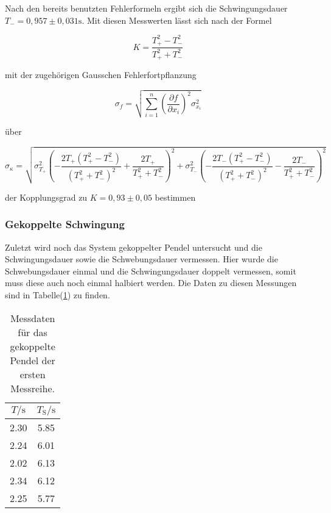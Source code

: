             \noindent Nach den bereits benutzten Fehlerformeln ergibt sich die Schwingungsdauer $T_- = 0,957 \pm 0,031 \si{\second}$.
            Mit diesen Messwerten lässt sich nach der Formel 

            \begin{equation*}
            K = \frac{T_{+}^2 - T_{-}^2}{T_{+}^2 + T_{-}^2} 
            \end{equation*}

            \noindent mit der zugehörigen Gausschen Fehlerfortpflanzung
            
            \begin{equation}
            \sigma_f = \sqrt{\sum_{i=1}^{n} \left( \frac{\partial f}{\partial x_i} \right)^2 \sigma_{x_i}^2}
            \label{eqn:gauss}
            \end{equation}
            
            \noindent über

            \begin{equation*}
                \sigma_{\kappa} = \sqrt{\sigma_{T_{+}}^{2} \left(- \frac{2 T_{+} \left(T_{+}^{2} - T_{-}^{2}\right)}{\left(T_{+}^{2}
                 + T_{-}^{2}\right)^{2}} + \frac{2 T_{+}}{T_{+}^{2} + T_{-}^{2}}\right)^{2} + \sigma_{T_{-}}^{2} \left(- \frac{2 T_{-}
                  \left(T_{+}^{2} - T_{-}^{2}\right)}{\left(T_{+}^{2} + T_{-}^{2}\right)^{2}} - \frac{2 T_{-}}{T_{+}^{2} + T_{-}^{2}}\right)^{2}}
            \end{equation*}

            \noindent der Kopplungsgrad zu $K = 0,93 \pm 0,05$ bestimmen

        \subsubsection{Gekoppelte Schwingung}

            \noindent Zuletzt wird noch das System gekoppelter Pendel untersucht und die Schwingungsdauer sowie die Schwebungsdauer vermessen. 
            Hier wurde die Schwebungsdauer einmal und die Schwingungsdauer doppelt vermessen, somit muss diese auch noch einmal halbiert werden. 
            Die Daten zu diesen Messungen sind in Tabelle(\ref{tab:gek1}) zu finden.

            \begin{table}[ht]
                \centering
                \caption{Messdaten für das gekoppelte Pendel der ersten Messreihe.}
                \label{tab:gek1}
                \begin{tabular}{c c}
                 \toprule
                 $T / \si{\s}$ & $T_{\text{S}} / \si{\s}$\\
                 \midrule
                 2.30   & 5.85 \\
                 2.24   & 6.01 \\
                 2.02   & 6.13 \\
                 2.34   & 6.12 \\
                 2.25   & 5.77 \\
                 \bottomrule
                \end{tabular}
            \end{table}

